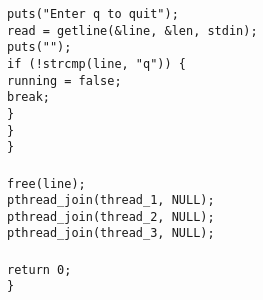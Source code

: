 \documentclass[a4paper, 12pt]{article}
\begin{document}
\begin{appendices}
	\texttt{\hspace*{3em}puts("Enter q to quit");} \\\noindent
	\texttt{\hspace*{3em}read = getline(\&line, \&len, stdin);} \\\noindent
	\texttt{\hspace*{3em}puts("");} \\\noindent
	\texttt{\hspace*{3em}if (!strcmp(line, "q")) \{ \\\noindent}
	\texttt{\hspace*{4em}running = false;} \\\noindent
	\texttt{\hspace*{4em}break;} \\\noindent
	\texttt{\hspace*{3em}\}} \\\noindent
	\texttt{\hspace*{2em}\}} \\\noindent
	\texttt{\hspace*{1em}\}} \\\noindent
	\texttt{\hspace*{1em}\\\noindent}
	\texttt{\hspace*{1em}free(line);} \\\noindent
	\texttt{\hspace*{1em}pthread\_join(thread\_1, NULL);} \\\noindent
	\texttt{\hspace*{1em}pthread\_join(thread\_2, NULL);} \\\noindent
	\texttt{\hspace*{1em}pthread\_join(thread\_3, NULL);} \\\noindent
	\texttt{\hspace*{1em}\\\noindent}
	\texttt{\hspace*{1em}return 0;} \\\noindent
        \texttt{\}} \\\noindent

\end{appendices}
\end{document}
